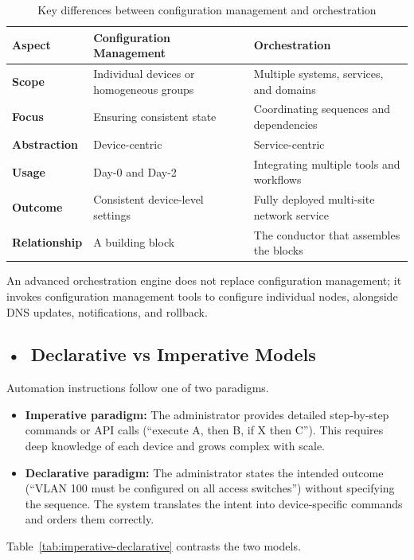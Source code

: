 \begin{table}[!htbp]
\centering
\small
\begin{tabularx}{\textwidth}{|p{2.6cm}|X|X|}
\hline
\textbf{Aspect} & \textbf{Configuration Management} & \textbf{Orchestration} \\ \hline
\textbf{Scope} & Individual devices or homogeneous groups & Multiple systems, services, and domains \\ \hline
\textbf{Focus} & Ensuring consistent state & Coordinating sequences and dependencies \\ \hline
\textbf{Abstraction} & Device-centric & Service-centric \\ \hline
\textbf{Usage} & Day-0 and Day-2 & Integrating multiple tools and workflows \\ \hline
\textbf{Outcome} & Consistent device-level settings & Fully deployed multi-site network service \\ \hline
\textbf{Relationship} & A building block & The conductor that assembles the blocks \\ \hline
\end{tabularx}
\caption{Key differences between configuration management and orchestration}
\label{tab:config-orchestration}
\end{table}

An advanced orchestration engine does not replace configuration management; it invokes configuration management tools to configure individual nodes, alongside DNS updates, notifications, and rollback.

\subsection*{\mbox{•}~Declarative vs Imperative Models}
Automation instructions follow one of two paradigms.
\begin{itemize}
    \item \textbf{Imperative paradigm:} The administrator provides detailed step‑by‑step commands or API calls (“execute A, then B, if X then C”). This requires deep knowledge of each device and grows complex with scale.
    \item \textbf{Declarative paradigm:} The administrator states the intended outcome (“VLAN 100 must be configured on all access switches”) without specifying the sequence. The system translates the intent into device‑specific commands and orders them correctly.
\end{itemize}
Table~\ref{tab:imperative-declarative} contrasts the two models.

